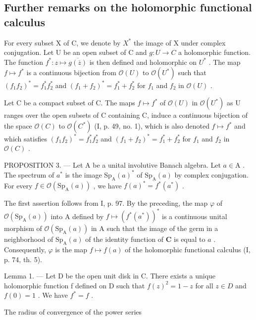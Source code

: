 \subsection{Further remarks on the holomorphic functional calculus}

For every subset X of C, we denote by \(X^{*}\) the image of X under complex conjugation. Let U be an open subset of C and \(g: U \to C\) a holomorphic function. The function \(f^{*}: z \mapsto \overline{g(\overline{z})}\) is then defined and holomorphic on \(U^{*}\) . The map \(f \mapsto f^{*}\) is a continuous bijection from \(\mathcal{O}(U)\) to \(\mathcal{O}(U^{*})\) such that \((f_{1}f_{2})^{*} = f_{1}^{*}f_{2}^{*}\) and \((f_{1} + f_{2})^{*} = f_{1}^{*} + f_{2}^{*}\) for \(f_{1}\) and \(f_{2}\) in \(\mathcal{O}(U)\) .

Let C be a compact subset of C. The maps \(f \mapsto f^{*}\) of \(\mathcal{O}(U)\) in \(\mathcal{O}(U^{*})\) as U ranges over the open subsets of C containing C, induce a continuous bijection of the space \(\mathcal{O}(C)\) to \(\mathcal{O}(C^{*})\) (I, p. 49, no. 1), which is also denoted \(f \mapsto f^{*}\) and which satisfies \((f_{1}f_{2})^{*} = f_{1}^{*}f_{2}^{*}\) and \((f_{1} + f_{2})^{*} = f_{1}^{*} + f_{2}^{*}\) for \(f_{1}\) and \(f_{2}\) in \(\mathcal{O}(C)\) .

PROPOSITION 3. --- Let A be a unital involutive Banach algebra. Let \(a \in \mathrm{A}\) . The spectrum of \(a^{*}\) is the image \(\mathrm{Sp}_{\mathrm{A}}(a)^{*}\) of \(\mathrm{Sp}_{\mathrm{A}}(a)\) by complex conjugation. For every \(f \in \mathcal{O}(\mathrm{Sp}_{\mathrm{A}}(a))\) , we have \(f(a)^{*} = f^{*}(a^{*})\) .

The first assertion follows from I, p. 97. By the preceding, the map \(\varphi\) of \(\mathcal{O}(\mathrm{Sp}_{\mathrm{A}}(a))\) into A defined by \(f \mapsto (f^{*}(a^{*}))^{*}\) is a continuous unital morphism of \(\mathcal{O}(\mathrm{Sp}_{\mathrm{A}}(a))\) in A such that the image of the germ in a neighborhood of \(\mathrm{Sp}_{\mathrm{A}}(a)\) of the identity function of \(\mathbf{C}\) is equal to \(a\) . Consequently, \(\varphi\) is the map \(f \mapsto f(a)\) of the holomorphic functional calculus (I, p. 74, th. 5).

Lemma 1. --- Let D be the open unit disk in C. There exists a unique holomorphic function f defined on D such that \(f(z)^{2} = 1 - z\) for all \(z \in D\) and \(f(0) = 1\) . We have \(f^{*} = f\) .

The radius of convergence of the power series

